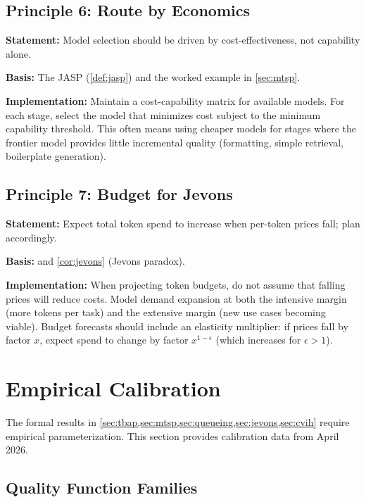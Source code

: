 \documentclass[11pt, a4paper, copyright]{googledeepmind}
\begin{document}
\subsection{Principle 6: Route by Economics}

\textbf{Statement:} Model selection should be driven by cost-effectiveness, not capability alone.

\textbf{Basis:} The JASP (\cref{def:jasp}) and the worked example in \cref{sec:mtsp}.

\textbf{Implementation:} Maintain a cost-capability matrix for available models. For each stage, select the model that minimizes cost subject to the minimum capability threshold. This often means using cheaper models for stages where the frontier model provides little incremental quality (formatting, simple retrieval, boilerplate generation).

\subsection{Principle 7: Budget for Jevons}

\textbf{Statement:} Expect total token spend to increase when per-token prices fall; plan accordingly.

\textbf{Basis:}  and \cref{cor:jevons} (Jevons paradox).

\textbf{Implementation:} When projecting token budgets, do not assume that falling prices will reduce costs. Model demand expansion at both the intensive margin (more tokens per task) and the extensive margin (new use cases becoming viable). Budget forecasts should include an elasticity multiplier: if prices fall by factor $x$, expect spend to change by factor $x^{1-\epsilon}$ (which increases for $\epsilon > 1$).


\section{Empirical Calibration}\label{sec:calibration}

The formal results in \cref{sec:tbap,sec:mtsp,sec:queueing,sec:jevons,sec:cvih} require empirical parameterization. This section provides calibration data from April 2026.

\subsection{Quality Function Families}
\end{document}
